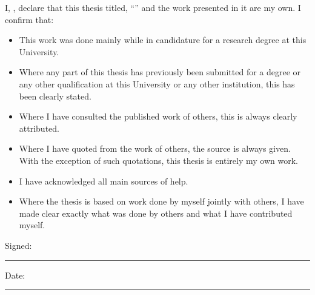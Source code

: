 \documentclass[
12pt, %
openany,
english, %
onehalfspacing, %
headsepline, %
]{MastersDoctoralThesis} %
\begin{document}

\begin{declaration}
\addchaptertocentry{\authorshipname}

\noindent I, \authorname, declare that this thesis titled, \enquote{\ttitle} and the work presented in it are my own. I confirm that:

\begin{itemize} 
\item This work was done mainly while in candidature for a research degree at this University.
\item Where any part of this thesis has previously been submitted for a degree or any other qualification at this University or any other institution, this has been clearly stated.
\item Where I have consulted the published work of others, this is always clearly attributed.
\item Where I have quoted from the work of others, the source is always given. With the exception of such quotations, this thesis is entirely my own work.
\item I have acknowledged all main sources of help.
\item Where the thesis is based on work done by myself jointly with others, I have made clear exactly what was done by others and what I have contributed myself.\\
\end{itemize}
 
\noindent Signed:\\
\rule[0.5em]{25em}{0.5pt} %
 
\noindent Date:\\
\rule[0.5em]{25em}{0.5pt} %
\end{declaration}




\end{document}
